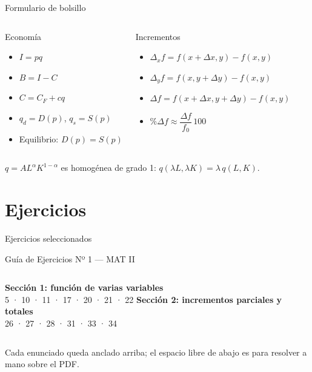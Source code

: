 \documentclass[aspectratio=169]{beamer}
\begin{document}
\begin{frame}{Formulario de bolsillo}
  \begin{columns}[T]
    \begin{block}{Economía}
      \begin{itemize}
        \item \(I=pq\)
        \item \(B=I-C\)
        \item \(C=C_F+cq\)
        \item \(q_d=D(p)\), \(q_s=S(p)\)
        \item Equilibrio: \(D(p)=S(p)\)
      \end{itemize}
    \end{block}
    \begin{block}{Incrementos}
      \begin{itemize}
        \item \(\Delta_x f=f(x+\Delta x,y)-f(x,y)\)
        \item \(\Delta_y f=f(x,y+\Delta y)-f(x,y)\)
        \item \(\Delta f=f(x+\Delta x,y+\Delta y)-f(x,y)\)
        \item \(\%\Delta f\approx \dfrac{\Delta f}{f_0}\,100\)
      \end{itemize}
    \end{block}
  \end{columns}
  \vspace{2pt}
  \begin{mwextra}
    \(q=AL^{\alpha}K^{1-\alpha}\) es homogénea de grado 1:
    \(q(\lambda L,\lambda K)=\lambda\,q(L,K)\).
  \end{mwextra}
\end{frame}

\section{Ejercicios}

\begin{frame}{Ejercicios seleccionados}
  \begin{block}{Guía de Ejercicios Nº 1 — MAT II}
    \begin{columns}[T]
      \textbf{Sección 1: función de varias variables}\\[2pt]
      5 · 10 · 11 · 17 · 20 · 21 · 22
      \textbf{Sección 2: incrementos parciales y totales}\\[2pt]
      26 · 27 · 28 · 31 · 33 · 34
    \end{columns}
  \end{block}
  \vspace{2pt}
  \begin{mwextra}
    Cada enunciado queda anclado arriba; el espacio libre de abajo es para
    resolver a mano sobre el PDF.
  \end{mwextra}
\end{frame}
\end{document}
